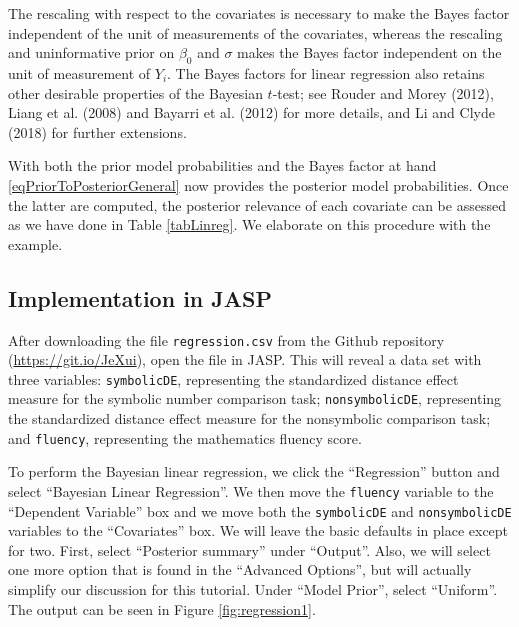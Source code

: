 \documentclass[english,,doc,floatsintext]{apa6}
\begin{document}
The rescaling with respect to the covariates is necessary to make the Bayes factor independent of the unit of measurements of the covariates, whereas the rescaling and uninformative prior on \(\beta_{0}\) and \(\sigma\) makes the Bayes factor independent on the unit of measurement of \(Y_{i}\). The Bayes factors for linear regression also retains other desirable properties of the Bayesian \(t\)-test; see Rouder and Morey (2012), Liang et al. (2008) and Bayarri et al. (2012) for more details, and Li and Clyde (2018) for further extensions.

With both the prior model probabilities and the Bayes factor at hand \eqref{eqPriorToPosteriorGeneral} now provides the posterior model probabilities. Once the latter are computed, the posterior relevance of each covariate can be assessed as we have done in Table \ref{tabLinreg}. We elaborate on this procedure with the example.

\hypertarget{implementation-in-jasp-1}{%
\subsection{Implementation in JASP}\label{implementation-in-jasp-1}}

After downloading the file \texttt{regression.csv} from the Github repository (\url{https://git.io/JeXui}), open the file in JASP. This will reveal a data set with three variables: \texttt{symbolicDE}, representing the standardized distance effect measure for the symbolic number comparison task; \texttt{nonsymbolicDE}, representing the standardized distance effect measure for the nonsymbolic comparison task; and \texttt{fluency}, representing the mathematics fluency score.

To perform the Bayesian linear regression, we click the ``Regression'' button and select ``Bayesian Linear Regression''. We then move the \texttt{fluency} variable to the ``Dependent Variable'' box and we move both the \texttt{symbolicDE} and \texttt{nonsymbolicDE} variables to the ``Covariates'' box. We will leave the basic defaults in place except for two. First, select ``Posterior summary'' under ``Output''. Also, we will select one more option that is found in the ``Advanced Options'', but will actually simplify our discussion for this tutorial. Under ``Model Prior'', select ``Uniform''. The output can be seen in Figure \ref{fig:regression1}.
\end{document}
